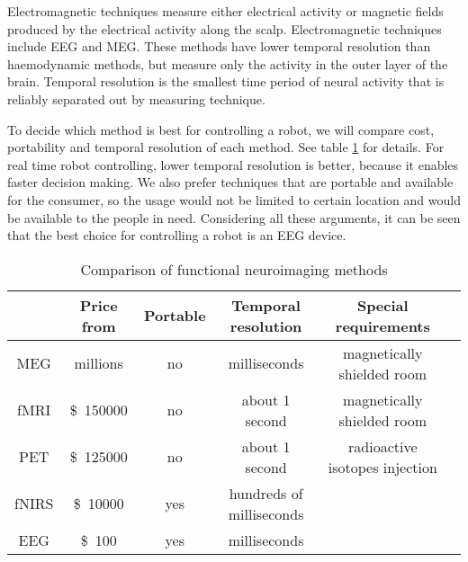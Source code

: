 Electromagnetic techniques measure either electrical activity or magnetic fields produced by the electrical activity along the scalp. Electromagnetic techniques include \acrfull{EEG} and \acrfull{MEG}. These methods have lower temporal resolution than haemodynamic methods, but measure only the activity in the outer layer of the brain. Temporal resolution is the smallest time period of neural activity that is reliably separated out by measuring technique.

To decide which method is best for controlling a robot, we will compare cost, portability and temporal resolution of each method. See table \ref{tab:neuroimaging} for details. For real time robot controlling, lower temporal resolution is better, because it enables faster decision making. We also prefer techniques that are portable and available for the consumer, so the usage would not be limited to certain location and would be available to the people in need. Considering all these arguments, it can be seen that the best choice for controlling a robot is an \acrshort{EEG} device.


\newcommand{\pMEG}{\tablefootnote{http://neurogadget.com/2012/12/15/inexpensive-magnetoencephalography-meg-system-could-be-available-at-every-hospital/6495}}
\newcommand{\pfMRI}{\tablefootnote{http://info.blockimaging.com/bid/92623/MRI-Machine-Cost-and-Price-Guide}}
\newcommand{\pPET}{\tablefootnote{http://info.blockimaging.com/bid/68875/How-Much-Does-a-PET-CT-Scanner-Cost}}
\newcommand{\plEEG}{\tablefootnote{http://en.wikipedia.org/wiki/Comparison\_of\_consumer\_brain-computer\_interfaces}}
\newcommand{\phEEG}{\tablefootnote{http://www.brainvision.com/files/actiCHamp-PyCorder-Flyer\_US.pdf}}
\newcommand{\pNIRS}{\cite{NIRS}}
\newcommand{\tresol}{\cite{timeresol}}


\begin{table}[h]
	\centering
	\begin{tabular}{|c|c|c|c|c|c|}
	\hline
				& Price	from				& Portable	& Temporal resolution	& Special requirements		\\\hline
\acrshort{MEG}	& millions\pMEG				& no	& milliseconds \tresol		& magnetically shielded room\\\hline
\acrshort{fMRI}	& \SI{150000}[\$]\pfMRI		& no	& about 1 second \tresol	& magnetically shielded room\\\hline
\acrshort{PET}	& \SI{125000}[\$]\pPET		& no	& about 1 second \tresol	& radioactive isotopes injection\\\hline
\acrshort{fNIRS}& \SI{10000}[\$]{} \pNIRS	& yes	& hundreds of milliseconds \pNIRS&						\\\hline
\acrshort{EEG}	& \SI{100}[\$]\plEEG		& yes	& milliseconds \tresol		&							\\\hline
	\end{tabular}
	\caption{Comparison of functional neuroimaging methods}
	\label{tab:neuroimaging}
\end{table}

